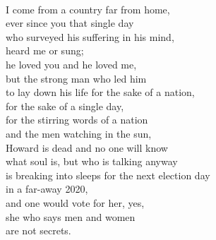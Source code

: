 \documentclass[smalldemyvopaper,11pt,twoside,onecolumn,openright,extrafontsizes]{memoir}
\begin{document}
\\I come from a country far from home,
\\ever since you that single day
\\who surveyed his suffering in his mind,
\\heard me or sung;
\\he loved you and he loved me,
\\but the strong man who led him
\\to lay down his life for the sake of a nation,
\\for the sake of a single day,
\\for the stirring words of a nation
\\and the men watching in the sun,
\\Howard is dead and no one will know
\\what soul is, but who is talking anyway
\\is breaking into sleeps for the next election day
\\in a far-away 2020,
\\and one would vote for her, yes,
\\she who says men and women
\\are not secrets.
\end{document}

